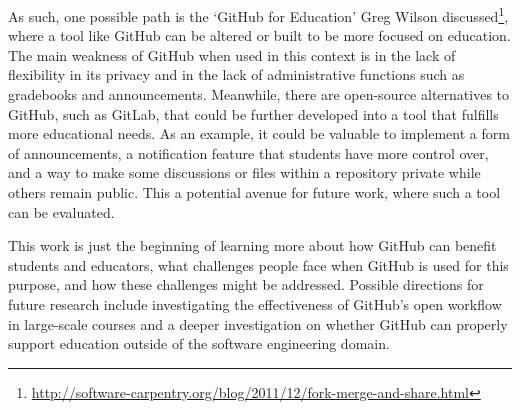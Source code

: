 As such, one possible path is the `GitHub for Education' Greg Wilson discussed\footnote{\url{http://software-carpentry.org/blog/2011/12/fork-merge-and-share.html}}, where a tool like GitHub can be altered or built to be more focused on education. The main weakness of GitHub when used in this context is in the lack of flexibility in its privacy and in the lack of administrative functions such as gradebooks and announcements. Meanwhile, there are open-source alternatives to GitHub, such as GitLab, that could be further developed into a tool that fulfills more educational needs. As an example, it could be valuable to implement a form of announcements, a notification feature that students have more control over, and a way to make some discussions or files within a repository private while others remain public. This a potential avenue for future work, where such a tool can be evaluated.

This work is just the beginning of learning more about how GitHub can benefit students and educators, what challenges people face when GitHub is used for this purpose, and how these challenges might be addressed. Possible directions for future research include investigating the effectiveness of GitHub's open workflow in large-scale courses and a deeper investigation on whether GitHub can properly support education outside of the software engineering domain.

